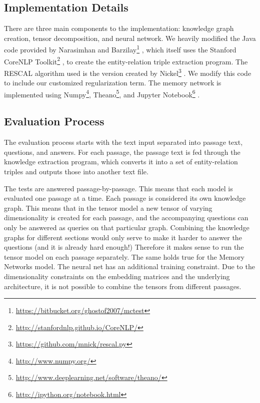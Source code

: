 \documentclass[pageno]{final_paper}
\begin{document}
\subsection{Implementation Details}
\label{Implementation Details}

There are three main components to the implementation: knowledge graph creation,
tensor decomposition, and neural network. We heavily modified the Java code
provided by Narasimhan and
Barzilay\footnote{\url{https://bitbucket.org/ghostof2007/mctest}}
\cite{Narasimhan2015}, which itself uses the Stanford CoreNLP
Toolkit\footnote{\url{http://stanfordnlp.github.io/CoreNLP/}}
\cite{Manning2014}, to create the entity-relation triple extraction program. The
RESCAL algorithm used is the version created by
Nickel\footnote{\url{https://github.com/mnick/rescal.py}} \cite{Nickel2011}. We
modify this code to include our customized regularization term. The memory
network is implemented using Numpy\footnote{\url{http://www.numpy.org/}},
Theano\footnote{\url{http://www.deeplearning.net/software/theano/}}, and Jupyter
Notebook\footnote{\url{http://ipython.org/notebook.html}} \cite{Jones2001,
Perez2007, Bastien2012, Bergstra2010}.

\subsection{Evaluation Process}
\label{Evaluation Process}

The evaluation process starts with the text input separated into passage text,
questions, and answers. For each passage, the passage text is fed through the
knowledge extraction program, which converts it into a set of entity-relation
triples and outputs those into another text file.

The tests are answered passage-by-passage. This means that each model is
evaluated one passage at a time. Each passage is considered its own knowledge
graph. This means that in the tensor model a new tensor of varying
dimensionality is created for each passage, and the accompanying questions can
only be answered as queries on that particular graph. Combining the knowledge
graphs for different sections would only serve to make it harder to answer the
questions (and it is already hard enough!) Therefore it makes sense to run the
tensor model on each passage separately. The same holds true for the Memory
Networks model. The neural net has an additional training constraint. Due to the
dimensionality constraints on the embedding matrices and the underlying
architecture, it is not possible to combine the tensors from different passages.
\end{document}
